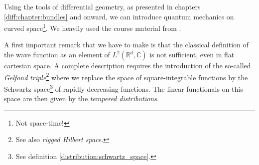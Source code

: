 	Using the tools of differential geometry, as presented in chapters \ref{diff:chapter:bundles} and onward, we can introduce quantum mechanics on curved space\footnote{Not space-time!}. We heavily used the course material from \cite{schuller}.

	\begin{remark}
		A first important remark that we have to make is that the classical definition of the wave function as an element of $L^2(\mathbb{R}^d, \mathbb{C})$ is not sufficient, even in flat cartesian space. A complete description requires the introduction of the so-called \textit{Gelfand triple}\footnote{See also \textit{rigged Hilbert space}.} where we replace the space of square-integrable functions by the Schwartz space\footnote{See definition \ref{distribution:schwartz_space}.} of rapidly decreasing functions. The linear functionals on this space are then given by the \textit{tempered distributions}.
	\end{remark}

